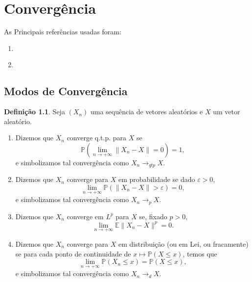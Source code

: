 \documentclass[12pt,a4paper,oneside]{book}
\theoremstyle{definition}
\newtheorem{definition}[theorem]{Defini\c{c}\~ao}
\theoremstyle{remark}
\numberwithin{equation}{section}
\newcommand{\e}{\varepsilon}
\newcommand{\E}{\mathbb{E}}
\newcommand{\pr}{\mathbb{P}}
\begin{document}
\chapter{Convergência}\label{cap- modos de convergencia}
\begin{tcolorbox}[colback = white]
As Principais referências usadas foram:
\begin{enumerate}
\item \cite{vaart-stat}
\item \cite{durrett}
\end{enumerate}
\end{tcolorbox}

\section{Modos de Convergência}



\begin{definition} 
Seja $(X_n)$ uma sequência de vetores aleatórios e $X$ um vetor aleatório.
\begin{enumerate}
\item Dizemos que $X_n$ converge q.t.p. para $X$ se 
$$\pr\left(\lim_{n\rightarrow +\infty} \|X_n-X\| = 0\right) = 1,$$
e simbolizamos tal convergência como $X_n \rightarrow_{qtp}X$.
\item Dizemos que $X_n$ converge para $X$ em probabilidade se  dado $\e>0$,
$$\lim_{n\rightarrow+\infty} \pr(\|X_n-X \|>\e) = 0, $$
e simbolizamos tal convergência como $X_n \rightarrow_{p}X$.

\item Dizemos que $X_n$ converge em $L^p$ para $X$ se, fixado $p>0$,
$$\lim_{n\rightarrow+\infty} \E \|X_n-X\|^p = 0.$$

\item Dizemos que $X_n$ converge para $X$ em distribuição (ou em Lei, ou fracamente) se para cada ponto de continuidade de $x\mapsto \pr(X\leq x)$, temos que
$$ \lim_{n\rightarrow+\infty}  \pr(X_n\leq x) = \pr(X\leq x),$$
e simbolizamos tal convergência como $X_n \rightarrow_{d}X$. 
\end{enumerate}
\end{definition}
\end{document}
